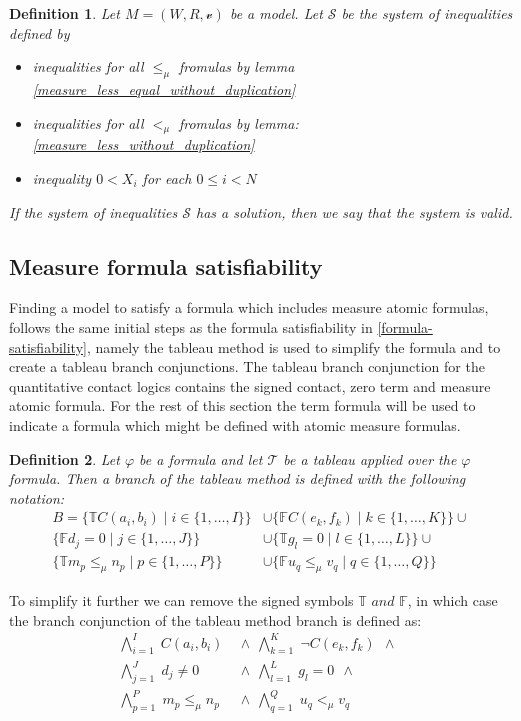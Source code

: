\documentclass{article}
\newtheorem{defn}{Definition}[section]
\newcommand{\vE}{\mathscr{v}}
\newcommand{\signT}{\mathbb{T}}
\newcommand{\signF}{\mathbb{F}}
\newcommand{\BranchConjunctionWithMeasure}{%
\begin{align*}
			\bigwedge_{i=1}^{I} \; C(a_i, b_i) \:\: & \wedge \:\: 
			\bigwedge_{k=1}^{K} \; \neg C(e_k, f_k) \:\: \wedge \:\: \\
			\bigwedge_{j=1}^{J} \; d_j \neq 0 \:\: & \wedge \:\:
			\bigwedge_{l=1}^{L} \; g_l = 0 \:\: \wedge \:\:\\
			\bigwedge_{p=1}^{P} \; m_p \le_\mu n_p \:\: &\wedge \:\:
			\bigwedge_{q=1}^{Q} \; u_q <_\mu v_q \:\:
\end{align*}%
}
\begin{document}
		\begin{defn}
			Let $M = (W, R, \vE)$ be a model. Let $\mathscr{S}$ be the system of inequalities defined by
			\begin{itemize}
				\item inequalities for all $\le_\mu$ fromulas by lemma \ref{measure_less_equal_without_duplication}
				\item inequalities for all $<_\mu$ fromulas by lemma: \ref{measure_less_without_duplication}
				\item inequality $0 < X_i$ for each $0 \le i < N$  
			\end{itemize}
			If the system of inequalities $\mathscr{S}$ has a solution, then we say that the system is valid.
		\end{defn}

\subsection{Measure formula satisfiability}
	Finding a model to satisfy a formula which includes measure atomic formulas, follows the same initial steps as the formula satisfiability in \ref{formula-satisfiability}, 
	namely the tableau method is used to simplify the formula and to create a tableau branch conjunctions.
	The tableau branch conjunction for the quantitative contact logics contains the signed contact, zero term and measure atomic formula.
	For the rest of this section the term formula will be used to indicate a formula which might be defined with atomic measure formulas.

	\begin{defn}
		Let $\varphi$ be a formula and let $\mathcal{T}$ be a tableau applied over the $\varphi$ formula.
		Then a branch of the tableau method is defined with the following notation:
		\begin{align*}
				B = \{\signT C(a_i, b_i) \mid i \in \{1, \ldots, I\} \} &\cup 
					\{\signF C(e_k, f_k) \mid k \in \{1, \ldots, K\} \} \cup \\
					\{\signF d_j = 0 \mid j \in \{1, \ldots, J\} \} &\cup 
					\{\signT g_l = 0 \mid l \in \{1, \ldots, L\} \} \cup \\
					\{\signT m_p \le_\mu n_p \mid p \in \{1, \ldots, P\} \} &\cup
					\{\signF u_q \le_\mu v_q \mid q \in \{1, \ldots, Q\} \}
		\end{align*}
	\end{defn}
	To simplify it further we can remove the signed symbols $\signT \textit{ and } \signF$, in which case the branch conjunction of the tableau method branch is defined as:
	\BranchConjunctionWithMeasure
\end{document}

